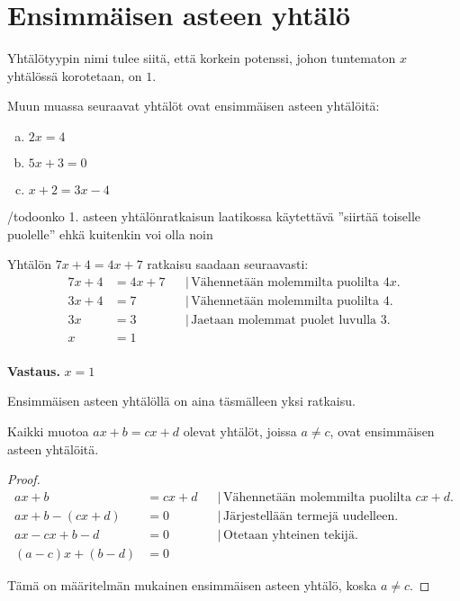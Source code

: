 \chapter{Ensimmäisen asteen yhtälö}


Yhtälötyypin nimi tulee siitä, että korkein potenssi, johon tuntematon $x$
yhtälössä korotetaan, on $1$.

\begin{esimerkki}
Muun muassa seuraavat yhtälöt ovat ensimmäisen asteen yhtälöitä:
\begin{enumerate}[a)]
\item $2x = 4$
\item $5x+3 = 0$
\item $x+2 = 3x-4$
\end{enumerate}
\end{esimerkki}

/todo{onko 1. asteen yhtälönratkaisun laatikossa käytettävä ''siirtää toiselle puolelle'' ehkä kuitenkin voi olla noin}

\begin{esimerkki}
Yhtälön $7x+4=4x+7$ ratkaisu saadaan seuraavasti:
\begin{align*}
7x+4 &= 4x+7 & &| \, \text{Vähennetään molemmilta puolilta $4x$.} \\
3x+4 &= 7 & &| \, \text{Vähennetään molemmilta puolilta 4.} \\
3x &= 3 & &| \, \text{Jaetaan molemmat puolet luvulla 3.} \\
x &= 1 & & \\
\end{align*}

\textbf{Vastaus.} $x=1$
\end{esimerkki}

Ensimmäisen asteen yhtälöllä on aina täsmälleen yksi ratkaisu.

\begin{theorem}
Kaikki muotoa $ax+b=cx+d$ olevat yhtälöt, joissa $a \neq c$, ovat ensimmäisen asteen yhtälöitä.
\end{theorem}

\begin{proof}
\begin{align*}
ax+b &= cx+d & &| \, \text{Vähennetään molemmilta puolilta $cx+d$}. \\
ax+b - (cx+d) &= 0 & &| \, \text{Järjestellään termejä uudelleen.} \\
ax - cx + b - d &= 0 & &| \, \text{Otetaan yhteinen tekijä.} \\
(a-c)x + (b-d) &= 0 & &
\end{align*}

Tämä on määritelmän mukainen ensimmäisen asteen yhtälö, koska $a \neq c$.
\end{proof}

